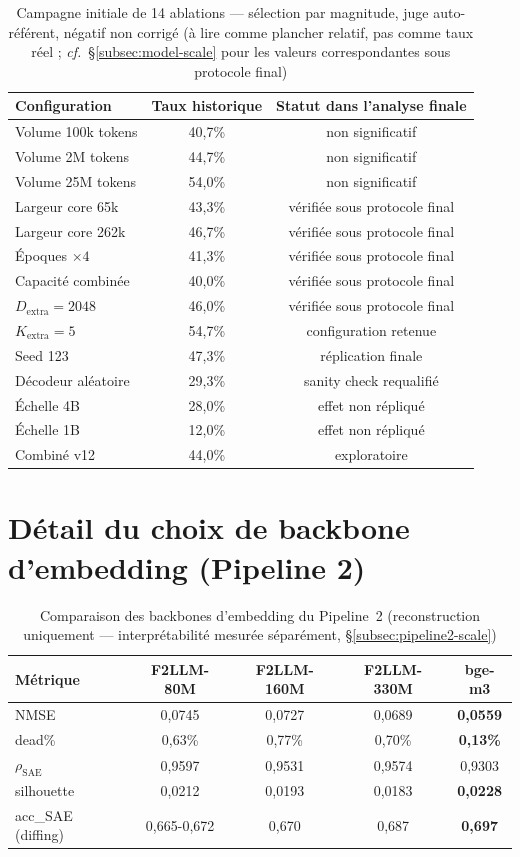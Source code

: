 \documentclass[11pt]{article}
\begin{document}
\begin{table}[!ht]
\centering
\caption{Campagne initiale de 14 ablations --- sélection par magnitude, juge
auto-référent, négatif non corrigé (à lire comme plancher relatif, pas comme
taux réel ; \emph{cf.}~\S\ref{subsec:model-scale} pour les valeurs
correspondantes sous protocole final)}
\label{tab:synthese}
\small
\begin{tabular}{@{}lcc@{}}
\toprule
Configuration & Taux historique & Statut dans l'analyse finale \\
\midrule
Volume 100k tokens & 40,7\% & non significatif \\
Volume 2M tokens & 44,7\% & non significatif \\
Volume 25M tokens & 54,0\% & non significatif \\
Largeur core 65k & 43,3\% & vérifiée sous protocole final \\
Largeur core 262k & 46,7\% & vérifiée sous protocole final \\
Époques $\times4$ & 41,3\% & vérifiée sous protocole final \\
Capacité combinée & 40,0\% & vérifiée sous protocole final \\
$D_\text{extra}=2048$ & 46,0\% & vérifiée sous protocole final \\
$K_\text{extra}=5$ & 54,7\% & configuration retenue \\
Seed 123 & 47,3\% & réplication finale \\
Décodeur aléatoire & 29,3\% & sanity check requalifié \\
Échelle 4B & 28,0\% & effet non répliqué \\
Échelle 1B & 12,0\% & effet non répliqué \\
Combiné v12 & 44,0\% & exploratoire \\
\bottomrule
\end{tabular}
\end{table}

\section{Détail du choix de backbone d'embedding (Pipeline 2)}
\label{app:pipeline2}

\begin{table}[!ht]
\centering
\caption{Comparaison des backbones d'embedding du Pipeline~2 (reconstruction
uniquement --- interprétabilité mesurée séparément, \S\ref{subsec:pipeline2-scale})}
\small
\begin{tabular}{@{}lcccc@{}}
\toprule
Métrique & F2LLM-80M & F2LLM-160M & F2LLM-330M & bge-m3 \\ \midrule
NMSE & 0,0745 & 0,0727 & 0,0689 & \textbf{0,0559} \\
dead\% & 0,63\% & 0,77\% & 0,70\% & \textbf{0,13\%} \\
$\rho_\text{SAE}$ & 0,9597 & 0,9531 & 0,9574 & 0,9303 \\
silhouette & 0,0212 & 0,0193 & 0,0183 & \textbf{0,0228} \\
acc\_SAE (diffing) & 0,665-0,672 & 0,670 & 0,687 & \textbf{0,697} \\
\bottomrule
\end{tabular}
\end{table}
\end{document}

